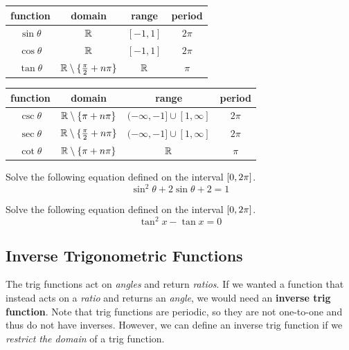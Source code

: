 \documentclass[12pt]{article}
\begin{document}
\newpage

\begin{center}
\renewcommand{\arraystretch}{1.5}
\begin{tabular}{|c|c|c|c|}
\hline
\rowcolor[HTML]{EFEFEF} 
       \textbf{function} & \textbf{domain} & \textbf{range} & \textbf{period} \\ \hline
$\sin\theta$    &  $\mathbb{R}$      & $[-1,1]$      &  $2\pi$      \\ \hline
$\cos\theta$  &  $\mathbb{R}$     & $[-1,1]$      & $2\pi$       \\ \hline
$\tan\theta$ &  $\mathbb{R}\setminus\{\frac{\pi}{2}+n\pi\} $    &  $\mathbb{R}$     &  $\pi$     \\ \hline  
\end{tabular}

\vspace{5mm}
\begin{tabular}{|c|c|c|c|}
\hline
\rowcolor[HTML]{EFEFEF} 
       \textbf{function} & \textbf{domain} & \textbf{range} & \textbf{period} \\ \hline      
$\csc\theta$    &  $\mathbb{R}\setminus\{\pi+n\pi\}$      & $(-\infty,-1]\cup[1,\infty]$      &  $2\pi$      \\ \hline
$\sec\theta$  &  $\mathbb{R}\setminus\{\frac{\pi}{2}+n\pi\}$     & $(-\infty,-1]\cup[1,\infty]$     & $2\pi$       \\ \hline
$\cot\theta$ &  $\mathbb{R}\setminus\{\pi+n\pi\} $    &  $\mathbb{R}$     &  $\pi$     \\ \hline
\end{tabular}
\end{center}

\vspace{3mm}

\Example Solve the following equation defined on the interval $\left[ 0,2\pi\right]$.
$$\sin^2\theta+2\sin\theta+2=1$$

\vspace{30mm}

\Example Solve the following equation defined on the interval $\left[ 0,2\pi\right]$.
$$\tan^2x-\tan x=0$$

\vspace{30mm}

\subsection*{Inverse Trigonometric Functions}

The trig functions act on \textit{angles} and return \textit{ratios}. If we wanted a function that instead acts on a \textit{ratio} and returns an \textit{angle}, we would need an \textbf{inverse trig function}. Note that trig functions are periodic, so they are not one-to-one and thus do not have inverses. However, we can define an inverse trig function if we \textit{restrict the domain} of a trig function.
\end{document}
